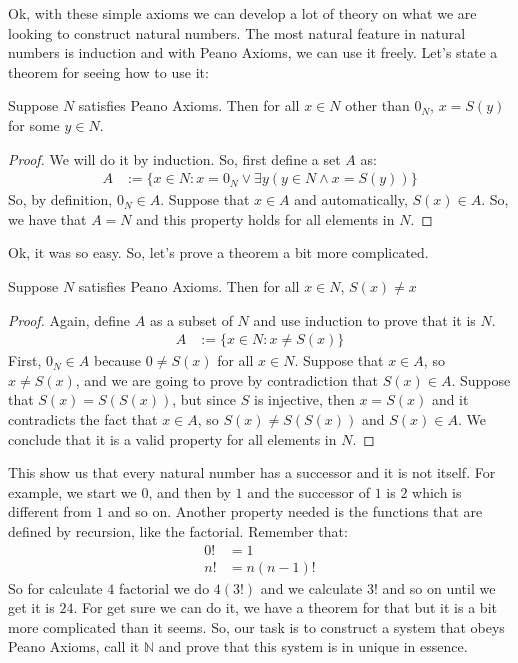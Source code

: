 \documentclass{tufte-handout}
\begin{document}
Ok, with these simple axioms we can develop a lot of theory on what we are looking to construct natural numbers. The most natural feature in natural numbers is induction and with Peano Axioms, we can use it freely. Let's state a theorem for seeing how to use it:
\begin{theorem}
	Suppose $N$ satisfies Peano Axioms. Then for all $x \in N$ other than $0_N$, $x = S(y)$ for some $y \in N$.
\end{theorem}
\begin{proof}
	We will do it by induction. So, first define a set $A$ as:
	\begin{align*}
		A &:= \{x \in N: x = 0_N \vee \exists y (y \in N \wedge x = S(y))\}
	\end{align*}
	So, by definition, $0_N \in A$. Suppose that $x \in A$ and automatically, $S(x) \in A$. So, we have that $A = N$ and this property holds for all elements in $N$.
\end{proof}

Ok, it was so easy. So, let's prove a theorem a bit more complicated.
\begin{theorem}
	Suppose $N$ satisfies Peano Axioms. Then for all $x \in N$, $S(x) \neq x$
\end{theorem}
\begin{proof}
	Again, define $A$ as a subset of $N$ and use induction to prove that it is $N$.
	\begin{align*}
		A &:= \{x \in N: x \neq S(x)\}
	\end{align*}
	First, $0_N \in A$ because $0 \neq S(x)$ for all $x \in N$. Suppose that $x \in A$, so $x \neq S(x)$, and we are going to prove by contradiction that $S(x) \in A$. Suppose that $S(x) = S(S(x))$, but since $S$ is injective, then $x = S(x)$ and it contradicts the fact that $x \in A$, so $S(x) \neq S(S(x))$ and $S(x) \in A$. We conclude that it is a valid property for all elements in $N$.
\end{proof}

This show us that every natural number has a successor and it is not itself. For example, we start we $0$, and then by $1$ and the successor of $1$ is $2$ which is different from $1$ and so on. Another property needed is the functions that are defined by recursion, like the factorial. Remember that:
\begin{align*}
	0! &= 1\\
	n! &= n(n-1)!
\end{align*}
So for calculate $4$ factorial we do $4(3!)$ and we calculate $3!$ and so on until we get it is $24$. For get sure we can do it, we have a theorem for that but it is a bit more complicated than it seems. So, our task is to construct a system that obeys Peano Axioms, call it $\mathbb{N}$ and prove that this system is in unique in essence.
\end{document}
